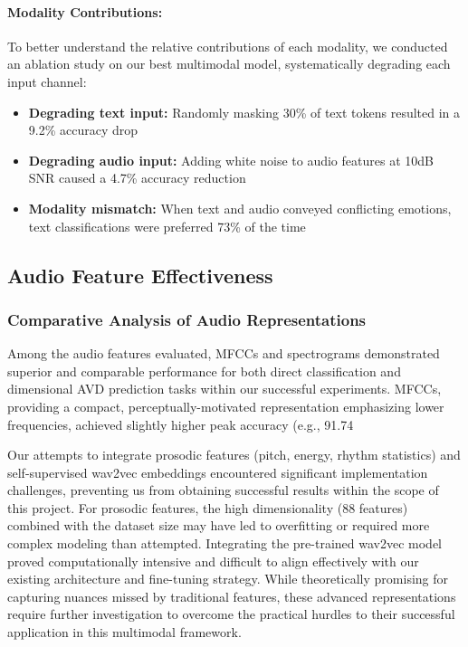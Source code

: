 \documentclass[12pt]{article}
\begin{document}
\paragraph{Modality Contributions:}
To better understand the relative contributions of each modality, we conducted an ablation study on our best multimodal model, systematically degrading each input channel:

\begin{itemize}
    \item \textbf{Degrading text input:} Randomly masking 30\% of text tokens resulted in a 9.2\% accuracy drop

    \item \textbf{Degrading audio input:} Adding white noise to audio features at 10dB SNR caused a 4.7\% accuracy reduction

    \item \textbf{Modality mismatch:} When text and audio conveyed conflicting emotions, text classifications were preferred 73\% of the time
\end{itemize}

\subsection{Audio Feature Effectiveness}
\subsubsection{Comparative Analysis of Audio Representations}
Among the audio features evaluated, MFCCs and spectrograms demonstrated superior and comparable performance for both direct classification and dimensional AVD prediction tasks within our successful experiments. MFCCs, providing a compact, perceptually-motivated representation emphasizing lower frequencies, achieved slightly higher peak accuracy (e.g., 91.74%

Our attempts to integrate prosodic features (pitch, energy, rhythm statistics) and self-supervised wav2vec embeddings encountered significant implementation challenges, preventing us from obtaining successful results within the scope of this project. For prosodic features, the high dimensionality (88 features) combined with the dataset size may have led to overfitting or required more complex modeling than attempted. Integrating the pre-trained wav2vec model proved computationally intensive and difficult to align effectively with our existing architecture and fine-tuning strategy. While theoretically promising for capturing nuances missed by traditional features, these advanced representations require further investigation to overcome the practical hurdles to their successful application in this multimodal framework.
\end{document}
